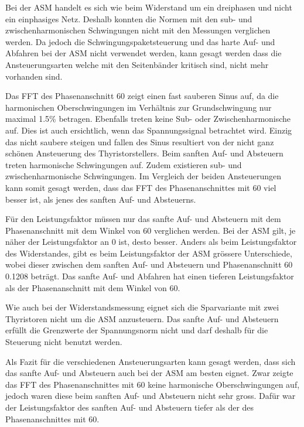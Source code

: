 Bei der ASM handelt es sich wie beim Widerstand um ein dreiphasen und nicht ein einphasiges Netz. Deshalb konnten die Normen mit den sub- und zwischenharmonischen Schwingungen nicht mit den Messungen verglichen werden. Da jedoch die Schwingungspaketsteuerung und das harte Auf- und Abfahren bei der ASM nicht verwendet werden, kann gesagt werden dass die Ansteuerungsarten welche mit den Seitenbänder kritisch sind, nicht mehr vorhanden sind. 

Das FFT des Phasenanschnitt 60\textdegree \hspace{0.02cm} zeigt einen fast sauberen Sinus auf, da die harmonischen Oberschwingungen im Verhältnis zur Grundschwingung nur maximal 1.5\% betragen. Ebenfalls treten keine Sub- oder Zwischenharmonische auf. Dies ist auch ersichtlich, wenn das Spannungssignal betrachtet wird. Einzig das nicht saubere steigen und fallen des Sinus resultiert von der nicht ganz schönen Ansteuerung des Thyristorstellers. Beim sanften Auf- und Absteuern treten harmonische Schwingungen auf. Zudem existieren sub- und zwischenharmonische Schwingungen. Im Vergleich der beiden Ansteuerungen kann somit gesagt werden, dass das FFT des Phasenanschnittes mit 60\textdegree \hspace{0.02cm} viel besser ist, als jenes des sanften Auf- und Absteuerns.

Für den Leistungsfaktor müssen nur das sanfte Auf- und Absteuern mit dem Phasenanschnitt mit dem Winkel von 60\textdegree \hspace{0.02cm} verglichen werden. Bei der ASM gilt, je näher der Leistungsfaktor an 0 ist, desto besser. Anders als beim Leistungsfaktor des Widerstandes, gibt es beim Leistungsfaktor der ASM grössere Unterschiede, wobei dieser zwischen dem sanften Auf- und Absteuern und Phasenanschnitt 60\textdegree \hspace{0.02cm} 0.1208 beträgt. Das sanfte Auf- und Abfahren hat einen tieferen Leistungsfaktor als der Phasenanschnitt mit dem Winkel von 60\textdegree. 

Wie auch bei der Widerstandsmessung eignet sich die Sparvariante mit zwei Thyristoren nicht um die ASM anzusteuern. Das sanfte Auf- und Absteuern erfüllt die Grenzwerte der Spannungsnorm nicht und darf deshalb für die Steuerung nicht benutzt werden.

Als Fazit für die verschiedenen Ansteuerungsarten kann gesagt werden, dass sich das sanfte Auf- und Absteuern auch bei der ASM am besten eignet. Zwar zeigte das FFT des Phasenanschnittes mit 60\textdegree \hspace{0.02cm} keine harmonische Oberschwingungen auf, jedoch waren diese beim sanften Auf- und Absteuern nicht sehr gross. Dafür war der Leistungsfaktor des sanften Auf- und Absteuern tiefer als der des Phasenanschnittes mit 60\textdegree.

